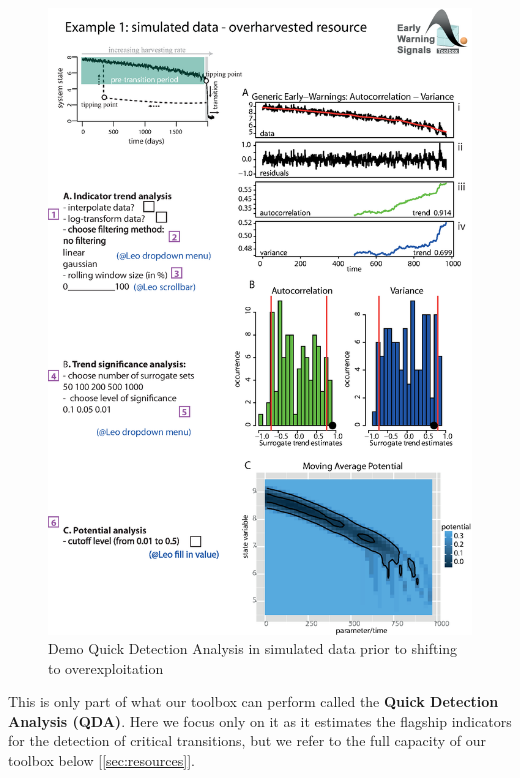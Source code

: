 \documentclass[12pt,a4paper,final]{article}
\begin{document}
\begin{figure}[ht]
\begin{center}
\includegraphics[scale=0.8]{fig_2_simulated_970pts.eps}
\caption{Demo Quick Detection Analysis in simulated data prior to shifting to overexploitation}
\end{center}
\label{fig:simulatedQDA}
\end{figure}

This is only part of what our toolbox can perform called the \textbf{Quick Detection Analysis (QDA)}. Here we focus only on it as it estimates the flagship indicators for the detection of critical transitions, but we refer to the full capacity of our toolbox below [\ref{sec:resources}].\\
 
\end{document}
